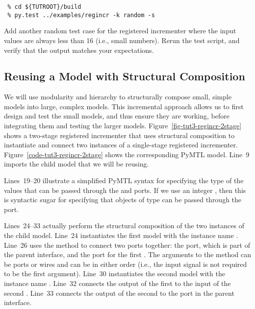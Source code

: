 \documentclass{cbxdoc}
\begin{document}
\begin{verbatim}
 % cd ${TUTROOT}/build
 % py.test ../examples/regincr -k random -s
\end{verbatim}

\begin{task}
  Add another random test case for the registered incrementer where the
  input values are always less than 16 (i.e., small numbers). Rerun the
  test script, and verify that the output matches your expectations.
\end{task}

\subsection{Reusing a Model with Structural Composition}





We will use modularity and hierarchy to structurally compose small,
simple models into large, complex models. This incremental approach
allows us to first design and test the small models, and thus ensure they
are working, before integrating them and testing the larger models.
Figure~\ref{fig-tut3-regincr-2stage} shows a two-stage registered
incrementer that uses structural composition to instantiate and connect
two instances of a single-stage registered incrementer.
Figure~\ref{code-tut3-regincr-2stage} shows the corresponding PyMTL
model. Line~9 imports the child model that we will be reusing.

Lines~19--20 illustrate a simplified PyMTL syntax for specifying the type
of the values that can be passed through the  and 
ports. If we use an integer , then this is syntactic sugar for
specifying that objects of type  can be passed through the
port.

Lines~24--33 actually perform the structural composition of the two
instances of the child model. Line~24 instantiates the first 
model with the instance name . Line~26 uses the
 method to connect two ports together: the  port,
which is part of the parent interface, and the  port for the first
. The arguments to the  method can be ports or
wires and can be in either order (i.e., the input signal is not required
to be the first argument). Line~30 instantiates the second 
model with the instance name . Line~32 connects the
output of the first  to the input of the second .
Line~33 connects the output of the second  to the 
port in the parent interface.
\end{document}
